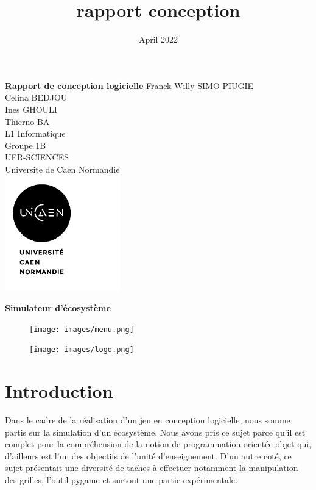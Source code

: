 \documentclass[a4paper,12pt]{article} %
\title{rapport conception}
\date{April 2022}
\begin{document}
\center
\large 
\textbf{Rapport de conception logicielle}
\vspace{1cm}
\center
Franck Willy SIMO PIUGIE\\
Celina BEDJOU\\
Ines GHOULI \\
Thierno BA \\
\vspace{1cm}
L1 Informatique\\

Groupe 1B\\

UFR-SCIENCES\\

Universite de Caen Normandie\\ 

\includegraphics[width=5cm]{images/LogoUNICAENv.png}

\center
\large 
\textbf{Simulateur d'écosystème}
\vspace{1cm}

\begin{figure}[h]
    \begin{minipage}[c]{.46\linewidth}
        \centering
        \texttt{[image: images/menu.png]}
    \end{minipage}
    \hfill%
    \begin{minipage}[c]{.46\linewidth}
        \centering
        \texttt{[image: images/logo.png]}
    \end{minipage}
\end{figure}


\newpage 
\center
\renewcommand{\contentsname}{Sommaire}
\tableofcontents

\newpage
\section{Introduction}

Dans le cadre de la réalisation d'un jeu en conception logicielle, nous somme partis sur la simulation d'un écosystème. Nous avons pris ce sujet parce qu'il est complet pour la compréhension de la notion de programmation orientée objet qui, d'ailleurs est l'un des objectifs de l'unité d'enseignement. D'un autre coté, ce sujet présentait une diversité de taches à effectuer notamment la manipulation des grilles, l'outil pygame et surtout une partie expérimentale.
\end{document}
